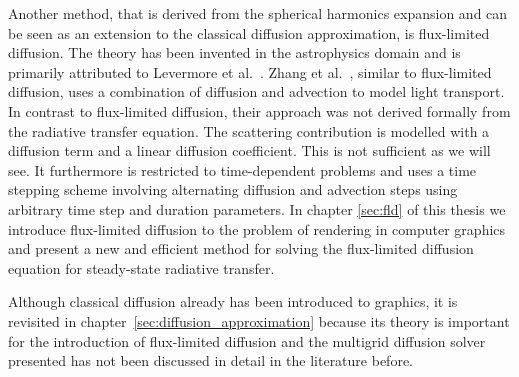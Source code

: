Another method, that is derived from the spherical harmonics expansion and can be seen as an extension to the classical diffusion approximation, is flux-limited diffusion. The theory has been invented in the astrophysics domain and is primarily attributed to Levermore et al.~\cite{Levermore81}. Zhang et al.~\cite{Zhang13}, similar to flux-limited diffusion, uses a combination of diffusion and advection to model light transport. In contrast to flux-limited diffusion, their approach was not derived formally from the radiative transfer equation. The scattering contribution is modelled with a diffusion term and a linear diffusion coefficient. This is not sufficient as we will see. It furthermore is restricted to time-dependent problems and uses a time stepping scheme involving alternating diffusion and advection steps using arbitrary time step and duration parameters. In chapter \ref{sec:fld} of this thesis we introduce flux-limited diffusion to the problem of rendering in computer graphics and present a new and efficient method for solving the flux-limited diffusion equation for steady-state radiative transfer.

Although classical diffusion already has been introduced to graphics, it is revisited in chapter~\ref{sec:diffusion_approximation} because its theory is important for the introduction of flux-limited diffusion and the multigrid diffusion solver presented has not been discussed in detail in the literature before.


